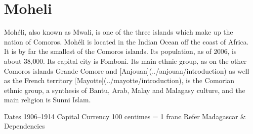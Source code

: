 \chapter{Moheli}

Moh\'eli, also known as Mwali, is one of the three islands which make up the nation of Comoros. Moh\'eli is located in the Indian Ocean off the coast of Africa. It is by far the smallest of the Comoros islands. Its population, as of 2006, is about 38,000. Its capital city is Fomboni. Its main ethnic group, as on the other Comoros islands Grande Comore and [Anjouan](../anjouan/introduction) as well as the French territory [Mayotte](../mayotte/introduction), is the Comorian ethnic group, a synthesis of Bantu, Arab, Malay and Malagasy culture, and the main religion is Sunni Islam.




Dates 
1906--1914
Capital 
Currency 
100 centimes = 1 franc
Refer 
Madagascar \& Dependencies 


                                           